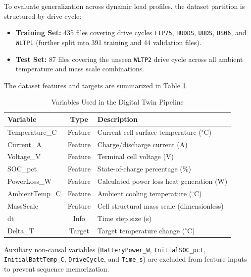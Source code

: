 To evaluate generalization across dynamic load profiles, the dataset partition is structured by drive cycle:
\begin{itemize}
    \item \textbf{Training Set:} 435 files covering drive cycles \texttt{FTP75}, \texttt{HUDDS}, \texttt{UDDS}, \texttt{US06}, and \texttt{WLTP1} (further split into 391 training and 44 validation files).
    \item \textbf{Test Set:} 87 files covering the unseen \texttt{WLTP2} drive cycle across all ambient temperature and mass scale combinations.
\end{itemize}
The dataset features and targets are summarized in Table \ref{tab:variables}.

\begin{table}[h]
\centering
\caption{Variables Used in the Digital Twin Pipeline}
\label{tab:variables}
\begin{tabular}{lcl}
\toprule
Variable & Type & Description \\
\midrule
Temperature\_C & Feature & Current cell surface temperature ($^\circ$C) \\
Current\_A & Feature & Charge/discharge current (A) \\
Voltage\_V & Feature & Terminal cell voltage (V) \\
SOC\_pct & Feature & State-of-charge percentage (\%) \\
PowerLoss\_W & Feature & Calculated power loss heat generation (W) \\
AmbientTemp\_C & Feature & Ambient cooling temperature ($^\circ$C) \\
MassScale & Feature & Cell structural mass scale (dimensionless) \\
dt & Info & Time step size (s) \\
Delta\_T & Target & Target temperature change ($^\circ$C) \\
\bottomrule
\end{tabular}
\end{table}

Auxiliary non-causal variables (\texttt{BatteryPower\_W}, \texttt{InitialSOC\_pct}, \texttt{InitialBattTemp\_C}, \texttt{DriveCycle}, and \texttt{Time\_s}) are excluded from feature inputs to prevent sequence memorization.

